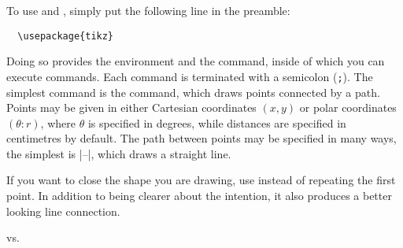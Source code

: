 To use  and \TikZ{}, simply put the following line in the
preamble:
\begin{verbatim}
  \usepackage{tikz}
\end{verbatim}
Doing so provides the  environment and the 
command, inside of which you can execute \TikZ{} commands. Each \TikZ{} command
is terminated with a semicolon (\verb|;|). The simplest command is the
 command, which draws points connected by a path. Points may be given
in either Cartesian coordinates \((x, y)\) or polar coordinates
\((\theta\mathpunct{:} r)\), where \(\theta\) is specified in degrees, while
distances are specified in centimetres by default. The path
between points may be specified in many ways, the simplest is
\ltx|--|, which draws a straight line.
\begin{example}
\end{example}
If you want to close the shape you are drawing, use  instead of
repeating the first point. In addition to being clearer about the intention,
it also produces a better looking line connection.
\begin{example}[vertical_mode, examplewidth=0.75\linewidth]
vs.\
\end{example}

